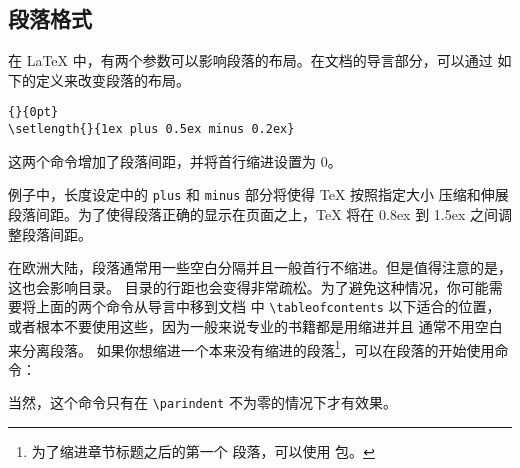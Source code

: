 \subsection{段落格式}\label{parsp}

在 \LaTeX{} 中，有两个参数可以影响段落的布局。在文档的导言部分，可以通过
如下的定义来改变段落的布局。
\begin{code}
\verb|{|\verb|}{0pt}| \\
\verb|\setlength{|\verb|}{1ex plus 0.5ex minus 0.2ex}|
\end{code}
这两个命令增加了段落间距，并将首行缩进设置为 $0$。

例子中，长度设定中的 \texttt{plus} 和 \texttt{minus} 部分将使得 \TeX{} 按照指定大小
压缩和伸展段落间距。为了使得段落正确的显示在页面之上，\TeX{} 将在 0.8ex 
到 1.5ex 之间调整段落间距。

在欧洲大陆，段落通常用一些空白分隔并且一般首行不缩进。但是值得注意的是，这也会影响目录。
目录的行距也会变得非常疏松。为了避免这种情况，你可能需要将上面的两个命令从导言中移到文档
中 \verb|\tableofcontents| 以下适合的位置，或者根本不要使用这些，因为一般来说专业的书籍都是用缩进并且
通常不用空白来分离段落。
%
如果你想缩进一个本来没有缩进的段落\footnote{为了缩进章节标题之后的第一个
段落，可以使用  包。}，可以在段落的开始使用命令：
\begin{lscommand}
\end{lscommand}
当然，这个命令只有在 \verb|\parindent| 不为零的情况下才有效果。

